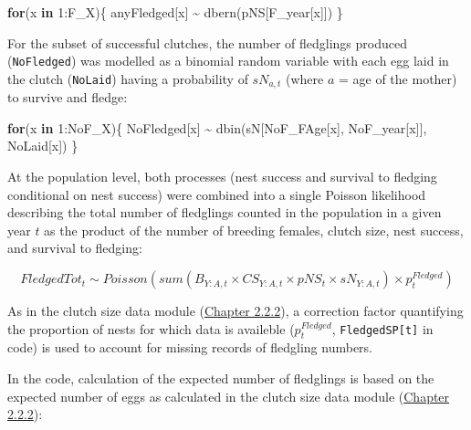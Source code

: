 \documentclass[
]{book}
\newenvironment{Shaded}{\begin{snugshade}}{\end{snugshade}}
\newcommand{\ControlFlowTok}[1]{\textcolor[rgb]{0.13,0.29,0.53}{\textbf{#1}}}
\newcommand{\DecValTok}[1]{\textcolor[rgb]{0.00,0.00,0.81}{#1}}
\newcommand{\FunctionTok}[1]{\textcolor[rgb]{0.00,0.00,0.00}{#1}}
\newcommand{\NormalTok}[1]{#1}
\newcommand{\SpecialCharTok}[1]{\textcolor[rgb]{0.00,0.00,0.00}{#1}}
\begin{document}
\begin{Shaded}
\begin{Highlighting}[]
\ControlFlowTok{for}\NormalTok{(x }\ControlFlowTok{in} \DecValTok{1}\SpecialCharTok{:}\NormalTok{F\_X)\{}
\NormalTok{  anyFledged[x] }\SpecialCharTok{\textasciitilde{}} \FunctionTok{dbern}\NormalTok{(pNS[F\_year[x]])}
\NormalTok{\}}
\end{Highlighting}
\end{Shaded}

For the subset of successful clutches, the number of fledglings produced
(\texttt{NoFledged}) was modelled as a binomial random variable with each egg laid in
the clutch (\texttt{NoLaid}) having a probability of \(sN_{a,t}\) (where \(a\) = age of the
mother) to survive and fledge:

\begin{Shaded}
\begin{Highlighting}[]
\ControlFlowTok{for}\NormalTok{(x }\ControlFlowTok{in} \DecValTok{1}\SpecialCharTok{:}\NormalTok{NoF\_X)\{}
\NormalTok{    NoFledged[x] }\SpecialCharTok{\textasciitilde{}} \FunctionTok{dbin}\NormalTok{(sN[NoF\_FAge[x], NoF\_year[x]], NoLaid[x])}
\NormalTok{\}}
\end{Highlighting}
\end{Shaded}

At the population level, both processes (nest success and survival to fledging
conditional on nest success) were combined into a single Poisson
likelihood describing the total number of fledglings counted in the population
in a given year \(t\) as the product of the number of breeding females, clutch
size, nest success, and survival to fledging:

\begin{equation}
FledgedTot_t  \sim Poisson(sum(B_{Y:A,t}\times CS_{Y:A,t}\times pNS_t\times sN_{Y:A,t}) \times p_t^{Fledged})
\end{equation}

As in the clutch size data module (\protect\hyperlink{ux5cux23ux5cux23ux5cux2520Clutchux5cux2520sizeux5cux2520dataux5cux2520likelihoods}{Chapter 2.2.2}),
a correction factor quantifying the proportion of nests for which data is
availeble (\(p_t^{Fledged}\), \texttt{FledgedSP{[}t{]}} in code) is used to account for
missing records of fledgling numbers.

In the code, calculation of the expected number of fledglings is based on the expected number of eggs as calculated in the clutch size data module
(\protect\hyperlink{ux5cux23ux5cux23ux5cux2520Clutchux5cux2520sizeux5cux2520dataux5cux2520likelihoods}{Chapter 2.2.2}):
\end{document}
